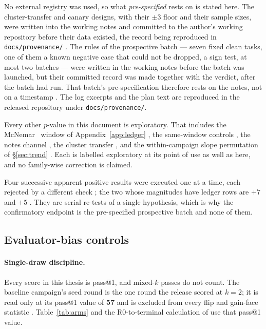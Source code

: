 No external registry was used, so what \emph{pre-specified} rests on is
stated here. The cluster-transfer and canary designs, with their
$\pm 3$ floor and their sample sizes, were written into the working notes
and committed to the author's working repository before their data
existed, the record being reproduced in \texttt{docs/provenance/}
. The rules of the prospective batch --- seven fixed clean
tasks, one of them a known negative case that could not be dropped, a
sign test, at most two batches --- were written in the working notes
before the batch was launched, but their committed record was made
together with the verdict, after the batch had run. That batch's
pre-specification therefore rests on the notes, not on a timestamp
. The log excerpts and the plan text are reproduced in the released
repository under \texttt{docs/provenance/}.

Every other $p$-value in this document is exploratory. That includes the
McNemar~\cite{mcnemar-1947} window of Appendix~\ref{app:ledger} , the same-window controls
, the notes channel , the cluster transfer , and the
within-campaign slope permutation of \S\ref{sec:trend} . Each is
labelled exploratory at its point of use as well as here, and no
family-wise correction is claimed.

Four successive apparent positive results were executed one at a time,
each rejected by a different check ; the two whose magnitudes have ledger rows are
$+7$ and $+5$ . They are serial re-tests of
a single hypothesis, which is why the confirmatory endpoint is the
pre-specified prospective batch and none of them.

\subsection{Evaluator-bias controls}
\label{sec:evaluator-bias}

\paragraph{Single-draw discipline.} Every score in this thesis is pass@1,
and mixed-$k$ passes do not count. The baseline campaign's seed round is
the one round the release scored at $k{=}2$; it is read only at its pass@1
value of \textbf{57} and is excluded from every flip and gain-face
statistic . Table~\ref{tab:arms} and the R0-to-terminal
calculation of  use that pass@1 value.

